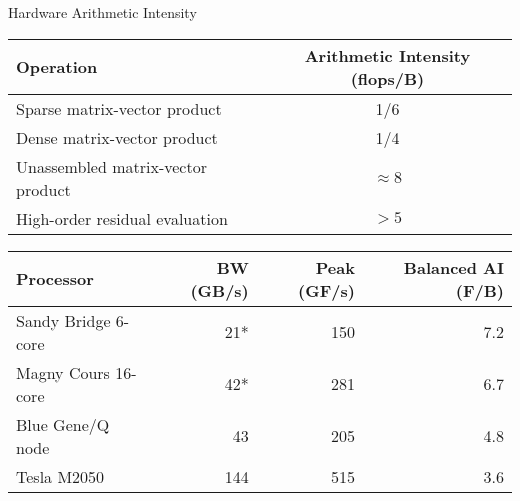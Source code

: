 \begin{frame}{Hardware Arithmetic Intensity}
  \begin{tabular}{lc}
    \toprule
    Operation                         & Arithmetic Intensity (flops/B) \\
    \midrule
    Sparse matrix-vector product      & 1/6                  \\
    Dense matrix-vector product       & 1/4                  \\
    Unassembled matrix-vector product & $\approx 8$          \\
    High-order residual evaluation    & $> 5$                \\
    \bottomrule
  \end{tabular}

  \bigskip

  \begin{tabular}{lrrr}
    \toprule
    Processor           & BW (GB/s) & Peak (GF/s) & Balanced AI (F/B) \\
    \midrule
    Sandy Bridge 6-core & 21*       & 150         & 7.2                 \\
    Magny Cours 16-core & 42*       & 281         & 6.7                 \\
    Blue Gene/Q node    & 43        & 205         & 4.8                 \\
    Tesla M2050         & 144       & 515        & 3.6                 \\
    \bottomrule
  \end{tabular}
\end{frame}
